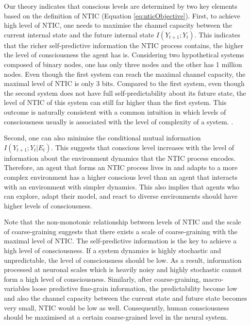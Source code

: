 \documentclass[utf8]{article}
\begin{document}
	    Our theory indicates that conscious levels are determined by two key elements based on the definition of NTIC (Equation \ref{eq:nticObjective}). First, to achieve high level of NTIC, one needs to maximise the channel capacity between the current internal state and the future internal state $I(Y_{t+1};Y_{t})$. This indicates that the richer self-predictive information the NTIC process contains, the higher the level of consciousness the agent has is. Considering two hypothetical systems composed of binary nodes, one has only three nodes and the other has 1 million nodes. Even though the first system can reach the maximal channel capacity, the maximal level of NTIC is only 3 bits. Compared to the first system, even though the second system does not have full self-predictability about its future state, the level of NTIC of this system can still far higher than the first system. This outcome is naturally consistent with a common intuition in which levels of consciousness usually is associated with the level of complexity of a system. . 
	    
	    Second, one can also minimise the conditional mutual information  $I(Y_{t+1};Y_{t}|E_{t})$. This suggests that conscious level increases with the level of information about the environment dynamics that the NTIC process encodes. Therefore, an agent that forms an NTIC process lives in and adapts to a more complex environment has a higher conscious level than an agent that interacts with an environment with simpler dynamics. This also implies that agents who can explore, adapt their model, and react to diverse environments should have higher levels of consciousness. 
	    
	    Note that the non-monotonic relationship between levels of NTIC and the scale of coarse-graining suggests that there exists a scale of coarse-graining with the maximal level of NTIC. The self-predictive information is the key to achieve a high level of consciousness. If a system dynamics is highly stochastic and unpredictable, the level of consciousness should be low. As a result, information processed at neuronal scales which is heavily noisy and highly stochastic cannot form a high level of consciousness. Similarly, after coarse-graining, macro-variables loose predictive fine-grain information, the predictability become low and also the channel capacity between the current state and future state becomes very small, NTIC would be low as well. Consequently, human consciousness should be maximised at a certain coarse-grained level in the neural system. 
	    
\end{document}
